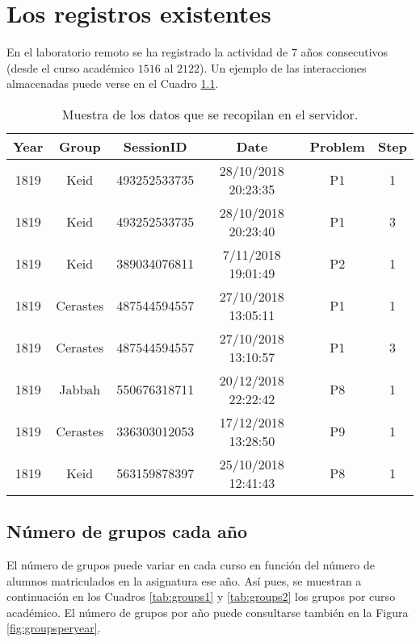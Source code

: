 \chapter{Los registros existentes}\label{sec:chapterVI}

En el laboratorio remoto se ha registrado la actividad de $7$ años consecutivos (desde el curso académico $1516$ al $2122$). Un ejemplo de las interacciones almacenadas puede verse en el Cuadro \ref{tab:example}.

\begin{table}[H]
\centering
\caption{Muestra de los datos que se recopilan en el servidor.}
\label{tab:example}
\begin{tabular}{cccccc}
\hline
\textbf{Year} & \textbf{Group} & \textbf{SessionID} & \textbf{Date}       & \textbf{Problem} & \textbf{Step} \\ \hline
1819          & Keid           & 493252533735       & 28/10/2018 20:23:35 & P1               & 1             \\ 
1819          & Keid           & 493252533735       & 28/10/2018 20:23:40 & P1               & 3             \\ 
1819          & Keid           & 389034076811       & 7/11/2018 19:01:49  & P2               & 1             \\
1819          & Cerastes       & 487544594557       & 27/10/2018 13:05:11 & P1               & 1             \\
1819          & Cerastes       & 487544594557       & 27/10/2018 13:10:57 & P1               & 3             \\
1819          & Jabbah         & 550676318711       & 20/12/2018 22:22:42 & P8               & 1             \\
1819          & Cerastes       & 336303012053       & 17/12/2018 13:28:50 & P9               & 1             \\ 
1819          & Keid           & 563159878397       & 25/10/2018 12:41:43 & P8               & 1             \\ \hline
\end{tabular}
\end{table}

\section{Número de grupos cada año}

El número de grupos puede variar en cada curso en función del número de alumnos matriculados en la asignatura ese año. Así pues, se muestran a continuación en los Cuadros \ref{tab:groups1} y \ref{tab:groups2} los grupos por curso académico. El número de grupos por año puede consultarse también en la Figura \ref{fig:groupsperyear}.

